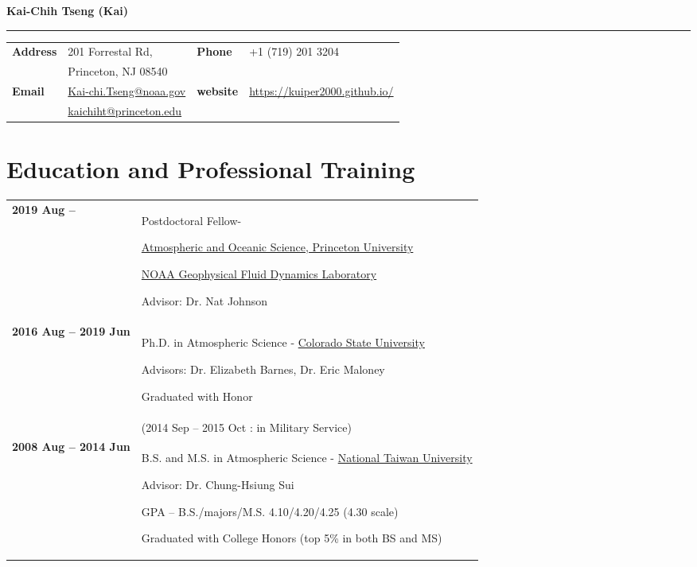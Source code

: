 \documentclass{article}
\begin{document}
{\huge\color{airforceblue}\textbf{Kai-Chih Tseng (Kai)}\par}
\rule{\textwidth}{0.5mm}\par

\vspace{5ex}

\begin{tabular}{
		>{\bfseries}p{.20\linewidth}
		p{.4\linewidth}
		>{\bfseries}p{.1\linewidth}
		p{.25\linewidth}
	}
	Address       & 201 Forrestal Rd,          &  Phone  & +1 (719) 201 3204 \\
	              & Princeton, NJ 08540          &    &  \\
	Email         & \href{mailto:Kai-chi.Tseng@noaa.gov}{Kai-chi.Tseng@noaa.gov} & website & \href{https://kuiper2000.github.io/}{https://kuiper2000.github.io/}    \\
                  & \href{mailto:kaichiht@princeton.edu}{kaichiht@princeton.edu} &       &     \\
\end{tabular}

\section{\color{airforceblue}Education and Professional Training}
\begin{tabular}{>{\bfseries}p{4cm}p{\linewidth-2.5cm\relax}}
	2019  Aug --   & Postdoctoral Fellow- \par
	\href{https://www.princeton.edu/}{Atmospheric and Oceanic Science, Princeton University} \par
	\href{https://www.gfdl.noaa.gov/}{NOAA Geophysical Fluid Dynamics Laboratory}\par
	Advisor: Dr. Nat Johnson \par
    \\
	2016  Aug -- 2019 Jun & Ph.D. in Atmospheric Science -
	\href{https://www.colostate.edu/}{Colorado State University}\par
	Advisors: Dr. Elizabeth Barnes, Dr. Eric Maloney \par
	Graduated with Honor \par
	\\
	 & (2014 Sep -- 2015 Oct : in Military Service) \par
	\\
	2008 Aug -- 2014 Jun & B.S. and M.S. in Atmospheric Science -
	\href{https://www.ntu.edu.tw/}{National Taiwan University}\par
	Advisor: Dr. Chung-Hsiung Sui \par
	GPA -- B.S./majors/M.S. 4.10/4.20/4.25 (4.30 scale) \par
	Graduated with College Honors (top 5\% in both BS and MS) \par
	

\end{tabular}
\end{document}
